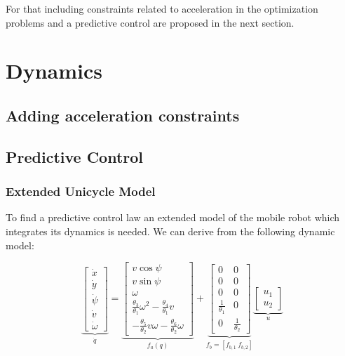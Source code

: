 \documentclass[letterpaper, 10 pt, conference]{ieeeconf}  %
\begin{document}
For that including constraints related to acceleration in the optimization problems and a predictive control are proposed in the next section.


\section{Dynamics}

\subsection{Adding acceleration constraints}

\subsection{Predictive Control}

\subsubsection{Extended Unicycle Model}

\mbox{}

To find a predictive control law an extended model of the mobile robot which integrates its dynamics is needed. We can derive from \cite{de2006dynamic} the following dynamic model:

\begin{equation}
\underbrace{\left[\begin{array}{c}
\dot{x}\\
\dot{y}\\
\dot{\psi}\\
\dot{v}\\
\dot{\omega}
\end{array}\right]}_{\dot{q}} =
\underbrace{\left[\begin{array}{c}
v\cos\psi\\
v\sin\psi\\
\omega\\
\frac{\theta_3}{\theta_1}\omega^2 - \frac{\theta_4}{\theta_1}v\\
-\frac{\theta_5}{\theta_2}v\omega - \frac{\theta_6}{\theta_2}\omega
\end{array}\right]}_{f_a(q)}+
\underbrace{\left[\begin{array}{cc}
0 & 0\\
0 & 0\\
0 & 0\\
\frac{1}{\theta_1} & 0\\
0 & \frac{1}{\theta_2}
\end{array}\right]}_{f_b = [f_{b,1}\ f_{b,2}]}
\underbrace{\left[\begin{array}{c}
u_1\\
u_2
\end{array}\right]}_{u}
\label{eq:extendedModel}
\end{equation}
\end{document}
